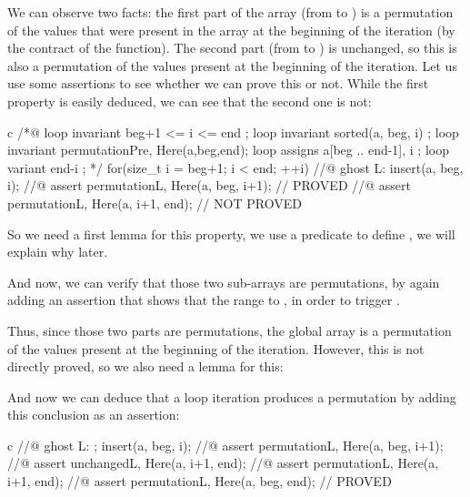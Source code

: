 We can observe two facts: the first part of the array (from  to
) is a permutation of the values that were present in the array
at the beginning of the iteration (by the contract of the 
function). The second part (from  to ) is
unchanged, so this is also a permutation of the values present at the beginning
of the iteration. Let us use some assertions to see whether we can prove this
or not. While the first property is easily deduced, we can see that the second
one is not:



\begin{CodeBlock}{c}
  /*@
    loop invariant beg+1 <= i <= end ;
    loop invariant sorted(a, beg, i) ;
    loop invariant permutation{Pre, Here}(a,beg,end);
    loop assigns a[beg .. end-1], i ;
    loop variant end-i ;
  */
  for(size_t i = beg+1; i < end; ++i) {
    //@ ghost L:
    insert(a, beg, i);
    //@ assert permutation{L, Here}(a, beg, i+1); // PROVED
    //@ assert permutation{L, Here}(a, i+1, end); // NOT PROVED
  }
\end{CodeBlock}


So we need a first lemma for this property, we use a predicate
 to define , we will explain why
later.




And now, we can verify that those two sub-arrays are permutations, by again
adding an assertion that shows that the range  to
, in order to trigger .




Thus, since those two parts are permutations, the global array is a permutation
of the values present at the beginning of the iteration. However, this is not
directly proved, so we also need a lemma for this:





And now we can deduce that a loop iteration produces a permutation by adding
this conclusion as an assertion:



\begin{CodeBlock}{c}
    //@ ghost L: ;
    insert(a, beg, i);
    //@ assert permutation{L, Here}(a, beg, i+1);
    //@ assert unchanged{L, Here}(a, i+1, end);
    //@ assert permutation{L, Here}(a, i+1, end);
    //@ assert permutation{L, Here}(a, beg, end); // PROVED
\end{CodeBlock}



